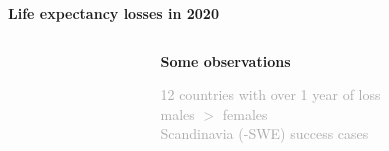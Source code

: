 \documentclass[xcolor={dvipsnames}]{beamer}
\begin{document}
\begin{frame}
\begin{center}
 \LARGE{\textbf{Life expectancy losses in 2020}}
\end{center}

\begin{columns}

\begin{column}{0.65\textwidth}
\vspace*{-.5cm}

\end{column}

 \pause

\begin{column}{0.35\textwidth}
\vspace*{-.8cm}

\Large{

\begin{center}\textbf{Some observations}\\
\end{center}

\textcolor{darkgray}{
12 countries with over 1 year of loss \linebreak \\
males $>$ females \linebreak \\
Scandinavia (-SWE) success cases
}}
\end{column}
\end{columns}  
\end{frame}
\end{document}
